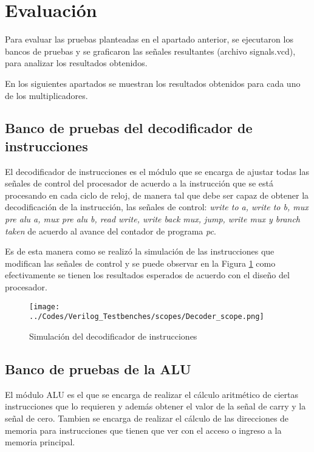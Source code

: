 \newpage
\section{Evaluaci\' on}

\par Para evaluar las pruebas planteadas en el apartado anterior, se ejecutaron los bancos de pruebas y se graficaron las se\~ nales resultantes (archivo signals.vcd), para analizar los resultados obtenidos.
\\
\par En los siguientes apartados se muestran los resultados obtenidos para cada uno de los multiplicadores.

\subsection{Banco de pruebas del decodificador de instrucciones}
El decodificador de instrucciones es el m\' odulo que se encarga de ajustar todas las se\~ nales de control del procesador de acuerdo a la instrucci\' on que se est\' a procesando en cada ciclo de reloj, de manera tal que debe ser capaz de obtener la decodificaci\' on de la instrucci\' on, las se\~ nales de control: \textit{write to a, write to b, mux pre alu a, mux pre alu b, read write, write back mux, jump, write mux y branch taken} de acuerdo al avance del contador de programa \textit{pc}.

Es de esta manera como se realiz\' o la simulaci\' on de las instrucciones que modifican las se\~ nales de control y se puede observar en la Figura \ref{fig:decoder} como efectivamente se tienen los resultados esperados de acuerdo con el dise\~ no del procesador.

\begin{figure}[hbtp]
\caption{Simulaci\' on del decodificador de instrucciones}
\centering
\texttt{[image: ../Codes/Verilog\_Testbenches/scopes/Decoder\_scope.png]}
\label{fig:decoder}
\end{figure}


\subsection{Banco de pruebas de la ALU}
El m\' odulo ALU es el que se encarga de realizar el c\' alculo aritm\' etico de ciertas instrucciones que lo requieren y adem\' as obtener el valor de la se\~ nal de carry y la se\~ nal de cero. Tambien se encarga de realizar el c\' alculo de las direcciones de memoria para instrucciones que tienen que ver con el acceso o ingreso a la memoria principal.

